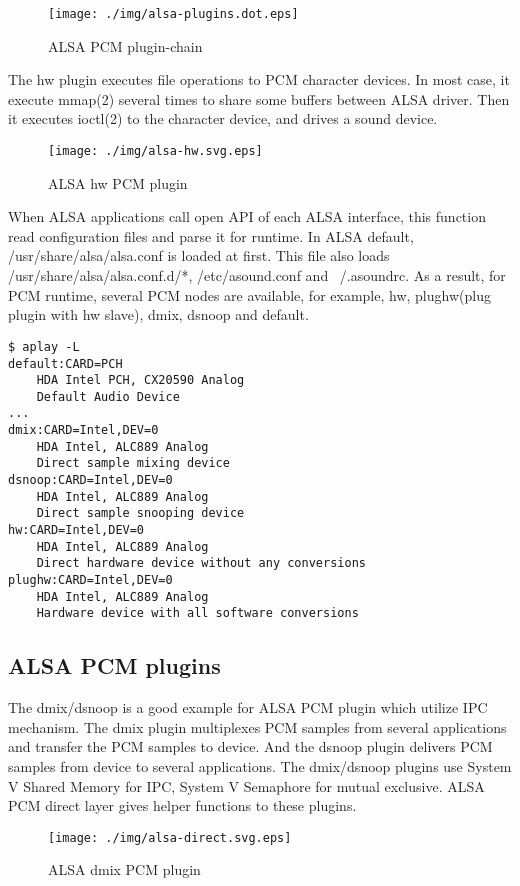 \documentclass[onecolumn]{article}
\begin{document}
\begin{figure}[htbp]
	\centering
	\texttt{[image: ./img/alsa-plugins.dot.eps]}
	\caption{{ALSA PCM plugin-chain}}
	\label{alsa_plugins}
\end{figure}

The hw plugin executes file operations to PCM character devices. In most case, it execute mmap(2) several times to share some buffers between ALSA driver. Then it executes ioctl(2) to the character device, and drives a sound device.

\begin{figure}[htbp]
	\centering
	\texttt{[image: ./img/alsa-hw.svg.eps]}
	\caption{{ALSA hw PCM plugin}}
	\label{alsa_hw_plugin}
\end{figure}

When ALSA applications call open API of each ALSA interface, this function read configuration files and parse it for runtime. In ALSA default, /usr/share/alsa/alsa.conf is loaded at first. This file also loads /usr/share/alsa/alsa.conf.d/*, /etc/asound.conf and ~/.asoundrc. As a result, for PCM runtime, several PCM nodes are available, for example, hw, plughw(plug plugin with hw slave), dmix, dsnoop and default.

\begin{verbatim}
$ aplay -L
default:CARD=PCH
    HDA Intel PCH, CX20590 Analog
    Default Audio Device
...
dmix:CARD=Intel,DEV=0
    HDA Intel, ALC889 Analog
    Direct sample mixing device
dsnoop:CARD=Intel,DEV=0
    HDA Intel, ALC889 Analog
    Direct sample snooping device
hw:CARD=Intel,DEV=0
    HDA Intel, ALC889 Analog
    Direct hardware device without any conversions
plughw:CARD=Intel,DEV=0
    HDA Intel, ALC889 Analog
    Hardware device with all software conversions
\end{verbatim}


\subsection{ALSA PCM plugins}
The dmix/dsnoop is a good example for ALSA PCM plugin which utilize IPC mechanism. The dmix plugin multiplexes PCM samples from several applications and transfer the PCM samples to device.  And the dsnoop plugin delivers PCM samples from device to several applications. The dmix/dsnoop plugins use System V Shared Memory for IPC, System V Semaphore for mutual exclusive. ALSA PCM direct layer gives helper functions to these plugins.

\begin{figure}[htbp]
	\centering
	\texttt{[image: ./img/alsa-direct.svg.eps]}
	\caption{ALSA dmix PCM plugin}
	\label{alsa_direct}
\end{figure}
\end{document}
